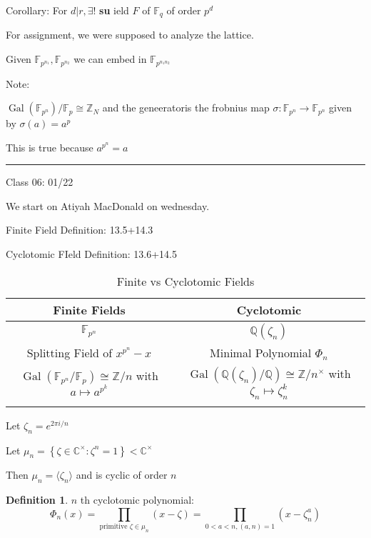 \documentclass{article}
\theoremstyle{definition}
\newtheorem{definition}{Definition}
\begin{document}
Corollary: For \(d \vert r, \exists !\) \textbf{su} ield \(F\) of \(\mathbb{F} _q\) of order \(p^d\)

For assignment, we were supposed to analyze the lattice.

Given \(\mathbb{F} _{p^{n_1}},\mathbb{F} _{p^{n_2}}\) we can embed in \(\mathbb{F} _{p^{n_1 n_2}}\)  

Note:

\(\operatorname{Gal}(\mathbb{F} _{p^n}) / \mathbb{F} _p \cong \mathbb{Z} _N \) and the geneeratoris the frobnius map \(\sigma : \mathbb{F} _{p^n} \to \mathbb{F} _{p^n}\) given by \(\sigma (a)=a^p\)  

This is true because \(a^{p^n}=a\) 

\hfil
\hrule

Class 06: 01/22

We start on Atiyah MacDonald on wednesday.

Finite Field Definition: 13.5+14.3

Cyclotomic FIeld Definition: 13.6+14.5

\begin{table}[H]
    \centering
    \begin{tabular}{c|c}
        \toprule
            Finite Fields &  Cyclotomic \\
        \midrule
            \(\mathbb{F}_{p^n}\)  &  \(\mathbb{Q}(\zeta _n)\)  \\
            Splitting Field of \(x^{p^n}-x\)  & Minimal Polynomial \(\Phi_n\)   \\
            \(\operatorname{Gal}(\mathbb{F} _{p^n} / \mathbb{F} _p) \cong \mathbb{Z} /n \) with \(a \mapsto a^{p^k}\)   & \(\operatorname{Gal}(\mathbb{Q} (\zeta _n) / \mathbb{Q}) \cong \mathbb{Z} / n^\times \) with \(\zeta_n \mapsto \zeta_n^k\)   \\
             &   \\
        \bottomrule
    \end{tabular}
    \caption{Finite vs Cyclotomic Fields}
    \label{tab:finvscycl}
\end{table}

Let \(\zeta _n = e^{2\pi i/n} \) 

Let \(\mu_n = \left\{ \zeta \in \mathbb{C} ^\times : \zeta ^n = 1 \right\} < \mathbb{C} ^\times \) 

Then \(\mu _n = \langle \zeta _n \rangle \) and is cyclic of order \(n\)

\begin{definition}
    \(n\) th cyclotomic polynomial:
    \[
        \Phi_n(x)=\prod_{\text{primitive }\zeta \in \mu_n } (x-\zeta)=\prod_{0<a<n, (a,n)=1} (x-\zeta_n^a)
    \]
\end{definition}
\end{document}
